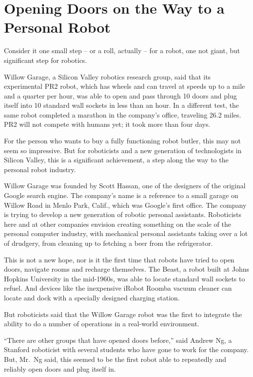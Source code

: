\documentclass[12pt,a4paper,onecolumn]{article}
\begin{document}
\section{Opening Doors on the Way to a Personal Robot}

Consider it one small step -- or a roll, actually -- for a robot, one not giant, but significant
step for robotics.

Willow Garage, a Silicon Valley robotics research group, said that its experimental PR2 robot, which
has wheels and can travel at speeds up to a mile and a quarter per hour, was able to open and pass
through 10 doors and plug itself into 10 standard wall sockets in less than an hour. In a different
test, the same robot completed a marathon in the company's office, traveling 26.2 miles. PR2 will
not compete with humans yet; it took more than four days.

For the person who wants to buy a fully functioning robot butler, this may not seem so impressive.
But for roboticists and a new generation of technologists in Silicon Valley, this is a significant
achievement, a step along the way to the personal robot industry.

Willow Garage was founded by Scott Hassan, one of the designers of the original Google search
engine. The company's name is a reference to a small garage on Willow Road in Menlo Park, Calif.,
which was Google's first office. The company is trying to develop a new generation of robotic
personal assistants. Roboticists here and at other companies envision creating something on the
scale of the personal computer industry, with mechanical personal assistants taking over a lot of
drudgery, from cleaning up to fetching a beer from the refrigerator.

This is not a new hope, nor is it the first time that robots have tried to open doors, navigate
rooms and recharge themselves. The Beast, a robot built at Johns Hopkins University in the
mid-1960s, was able to locate standard wall sockets to refuel. And devices like the inexpensive
iRobot Roomba vacuum cleaner can locate and dock with a specially designed charging station.

But roboticists said that the Willow Garage robot was the first to integrate the ability to do a
number of operations in a real-world environment.

``There are other groups that have opened doors before,'' said Andrew Ng, a Stanford roboticist with
several students who have gone to work for the company. But, Mr.~Ng said, this seemed to be the
first robot able to repeatedly and reliably open doors and plug itself in.
\end{document}
